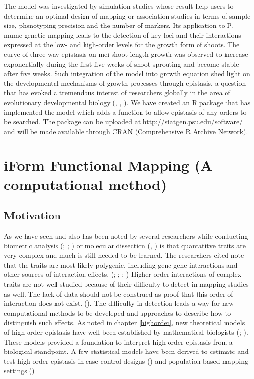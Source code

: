 \documentclass[11pt,]{book}
\theoremstyle{definition}
\theoremstyle{definition}
\theoremstyle{remark}
\begin{document}
The model was investigated by simulation studies whose result help users
to determine an optimal design of mapping or association studies in
terms of sample size, phenotyping precision and the number of markers.
Its application to P. mume genetic mapping leads to the detection of key
loci and their interactions expressed at the low- and high-order levels
for the growth form of shoots. The curve of three-way epistasis on mei
shoot length growth was observed to increase exponentially during the
first five weeks of shoot sprouting and become stable after five weeks.
Such integration of the model into growth equation shed light on the
developmental mechanisms of growth processes through epistasis, a
question that has evoked a tremendous interest of researchers globally
in the area of evolutionary developmental biology
(\cite{franks2007rapid}, \cite{cartolano2015heterochrony},
\cite{nishino2013network}). We have created an R package that has
implemented the model which adds a function to allow epistasis of any
orders to be searched. The package can be uploaded at
\url{http://statgen.psu.edu/software/} and will be made available
through CRAN (Comprehensive R Archive Network).

\chapter{iForm Functional Mapping (A computational
method)}\label{iform-functional-mapping-a-computational-method}

\section{Motivation}\label{motivation-2}

As we have seen and also has been noted by several researchers while
conducting biometric analysis (\cite{jinks1982biometrical};
\cite{hill2004ds}; \cite{wu1996detecting}) or molecular dissection
(\cite{mackay2009genetics}, \cite{park2010estimation}) is that
quantatitve traits are very complex and much is still needed to be
learned. The researchers cited note that the traits are most likely
polygenic, including gene-gene interactions and other sources of
interaction effects. (\cite{cheverud1995epistasis};
\cite{moore2003ubiquitous}; \cite{van2010detection};
\cite{mackay2014epistasis}) Higher order interactions of complex traits
are not well studied because of their difficulty to detect in mapping
studies as well. The lack of data should not be construed as proof that
this order of interaction does not exist. (\cite{taylor2015higher}). The
difficulty in detection leads a way for new computational methods to be
developed and approaches to describe how to distinguish such effects. As
noted in chapter \ref{highorder}, new theoretical models of high-order
epistasis have well been established by mathematical biologists
(\cite{hansen2001epistasis}; \cite{beerenwinkel2007analysis}). These
models provided a foundation to interpret high-order epistasis from a
biological standpoint. A few statistical models have been derived to
estimate and test high-order epistasis in case-control designs
(\cite{wang2015bayesian}) and population-based mapping settings
(\cite{pang2013statistical})
\end{document}
